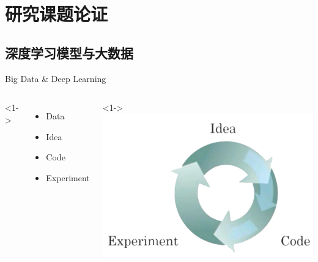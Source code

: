\section{研究课题论证}

\subsection{深度学习模型与大数据}

\begin{xframe}{Big Data \& Deep Learning}

    \begin{columns}
        <1->
        \begin{itemize}
            \item {Data\\
            }
            \item {Idea\\
            }
            \item {Code\\
            }
            \item {Experiment\\
            }
        \end{itemize}
        <1->
            \includegraphics[width=\textwidth,totalheight=0.5\textheight]{./style/images/circle.png}

    \end{columns}

\end{xframe}


